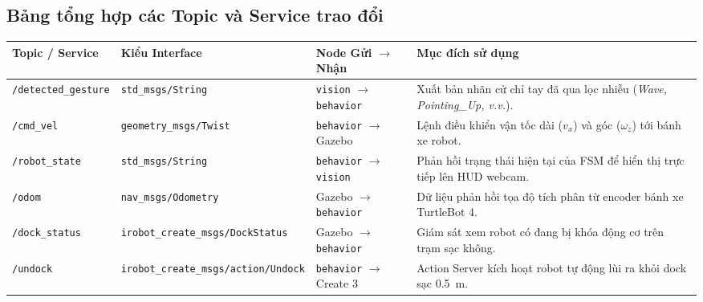 \subsection{Bảng tổng hợp các Topic và Service trao đổi}

\begin{table}[H]\centering
\footnotesize
\renewcommand{\arraystretch}{1.15}
\begin{tabularx}{\textwidth}{>{\raggedright\arraybackslash}p{2.6cm} >{\raggedright\arraybackslash}p{2.6cm} >{\raggedright\arraybackslash}p{2.0cm} X}
\toprule
\textbf{Topic / Service} & \textbf{Kiểu Interface} & \textbf{Node Gửi $\to$ Nhận} & \textbf{Mục đích sử dụng} \\
\midrule
\texttt{/detected\_gesture} & \texttt{std\_msgs/}\newline\texttt{String} & \texttt{vision} $\to$\newline\texttt{behavior} & Xuất bản nhãn cử chỉ tay đã qua lọc nhiễu (\textit{Wave, Pointing\_Up, v.v.}). \\
\addlinespace[2pt]
\texttt{/cmd\_vel} & \texttt{geometry\_msgs/}\newline\texttt{Twist} & \texttt{behavior} $\to$\newline Gazebo & Lệnh điều khiển vận tốc dài ($v_x$) và góc ($\omega_z$) tới bánh xe robot. \\
\addlinespace[2pt]
\texttt{/robot\_state} & \texttt{std\_msgs/}\newline\texttt{String} & \texttt{behavior} $\to$\newline\texttt{vision} & Phản hồi trạng thái hiện tại của FSM để hiển thị trực tiếp lên HUD webcam. \\
\addlinespace[2pt]
\texttt{/odom} & \texttt{nav\_msgs/}\newline\texttt{Odometry} & Gazebo $\to$\newline\texttt{behavior} & Dữ liệu phản hồi tọa độ tích phân từ encoder bánh xe TurtleBot 4. \\
\addlinespace[2pt]
\texttt{/dock\_status} & \texttt{irobot\_create\_msgs/}\newline\texttt{DockStatus} & Gazebo $\to$\newline\texttt{behavior} & Giám sát xem robot có đang bị khóa động cơ trên trạm sạc không. \\
\addlinespace[2pt]
\texttt{/undock} & \texttt{irobot\_create\_msgs/}\newline\texttt{action/Undock} & \texttt{behavior} $\to$\newline Create 3 & Action Server kích hoạt robot tự động lùi ra khỏi dock sạc \SI{0.5}{\meter}. \\

\end{tabularx}
\end{table}
